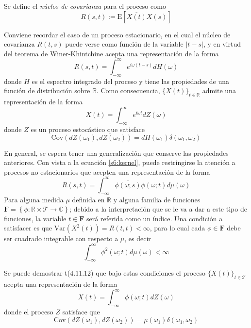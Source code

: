 \documentclass[12pt,letterpaper,draft]{book}
\newcommand{\R}{\mathbb{R}}
\newcommand{\C}{\mathbb{C}}
\newcommand{\intR}{\int_{-\infty}^{\infty}}
\newcommand{\ef}{\mathbf{F}}
\newcommand{\E}[1]{\mathrm{E}\left[ #1 \right]}
\newcommand{\Var}[1]{\mathrm{Var}\left( #1 \right)}
\newcommand{\Cov}[1]{\mathrm{Cov}\left( #1 \right)}
\newcommand{\abso}[1]{\left| #1 \right|}
\newcommand{\xt}{$\{X(t)\}_{t\in \mathcal{T}}$ }
\newcommand{\xtin}[1]{$\{X(t)\}_{t\in \mathcal{ #1 }}$ }
\begin{document}
Se define el \textit{núcleo de covarianza} para el proceso como
\begin{equation}
R(s,t) := \E{\overline{X(t)}X(s)}
\end{equation}

Conviene recordar el caso de un proceso estacionario, en el cual el núcleo de covarianza $R(t,s)$ puede verse como función de la variable $\abso{t-s}$, y en virtud del teorema de Winer-Khintchine acepta una representación de la forma
%
\begin{equation}
R(s,t) = \intR e^{i \omega (t-s)} dH(\omega)
\label{s6:kernel}
\end{equation}
%
donde $H$ es el espectro integrado del proceso y tiene las propiedades de una función de distribución sobre $\R$.
%
Como consecuencia, \xtin{\R} admite una representación de la forma
\begin{equation}
X(t) = \intR e^{i\omega t} dZ(\omega)
\end{equation}
%
donde $Z$ es un proceso estocástico que satisface
\begin{equation}
\Cov{dZ(\omega_1),dZ(\omega_2)} = dH(\omega_1) \delta(\omega_1, \omega_2)
\end{equation}

En general, se espera tener una generalización que conserve las propiedades anteriores. Con vista a la ecuación \ref{s6:kernel}, puede restringirse la atención a procesos no-estacionarios que acepten una representación de la forma
\begin{equation}
R(s,t) = \intR \overline{\phi(\omega;s)}\phi(\omega;t) d\mu(\omega)
\label{s6:erre}
\end{equation}
%
Para alguna medida $\mu$ definida en $\R$ y alguna familia de funciones 
$\ef = \left\{ \phi: \R \times \mathcal{T} \rightarrow \C \right\}$; debido a la interpretación que 
se le va a dar a este tipo de funciones, la variable $t\in \ef$ será referida como un índice.
%
Una condición a satisfacer es que $\Var{X^{2}(t)} = R(t,t) < \infty$, para lo cual cada 
$\phi \in \ef$ debe ser cuadrado integrable con respecto a $\mu$, es decir
\begin{equation}
\intR \phi^{2}(\omega;t) d\mu(\omega) < \infty
\end{equation}

Se puede demostrar t(4.11.12) que bajo estas condiciones el proceso \xt acepta una representación de la forma 
\begin{equation}
X(t) = \intR \phi(\omega;t) dZ(\omega)
\label{s6:representacion}
\end{equation}
donde el proceso $Z$ satisface que
\begin{equation}
\Cov{dZ(\omega_1),dZ(\omega_2)} = \mu(\omega_1) \delta(\omega_1, \omega_2)
\end{equation}
\end{document}
